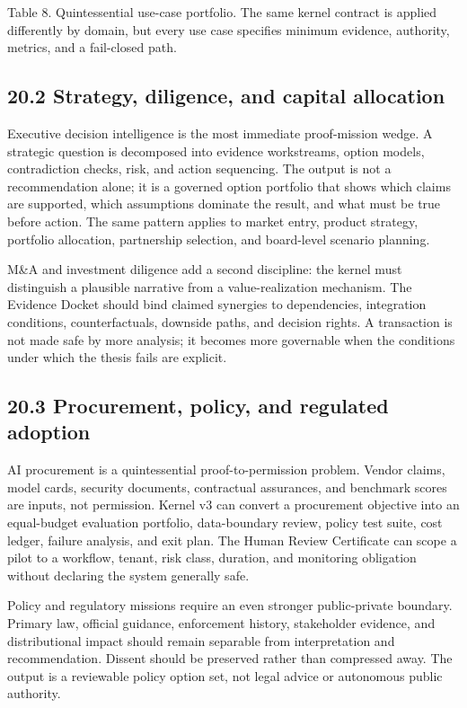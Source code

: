 Table 8. Quintessential use-case portfolio. The same kernel contract is
applied differently by domain, but every use case specifies minimum
evidence, authority, metrics, and a fail-closed path.

\subsection{20.2 Strategy, diligence, and capital
allocation}\label{strategy-diligence-and-capital-allocation}

Executive decision intelligence is the most immediate proof-mission
wedge. A strategic question is decomposed into evidence workstreams,
option models, contradiction checks, risk, and action sequencing. The
output is not a recommendation alone; it is a governed option portfolio
that shows which claims are supported, which assumptions dominate the
result, and what must be true before action. The same pattern applies to
market entry, product strategy, portfolio allocation, partnership
selection, and board-level scenario planning.

M\&A and investment diligence add a second discipline: the kernel must
distinguish a plausible narrative from a value-realization mechanism.
The Evidence Docket should bind claimed synergies to dependencies,
integration conditions, counterfactuals, downside paths, and decision
rights. A transaction is not made safe by more analysis; it becomes more
governable when the conditions under which the thesis fails are
explicit.

\subsection{20.3 Procurement, policy, and regulated
adoption}\label{procurement-policy-and-regulated-adoption}

AI procurement is a quintessential proof-to-permission problem. Vendor
claims, model cards, security documents, contractual assurances, and
benchmark scores are inputs, not permission. Kernel v3 can convert a
procurement objective into an equal-budget evaluation portfolio,
data-boundary review, policy test suite, cost ledger, failure analysis,
and exit plan. The Human Review Certificate can scope a pilot to a
workflow, tenant, risk class, duration, and monitoring obligation
without declaring the system generally safe.

Policy and regulatory missions require an even stronger public-private
boundary. Primary law, official guidance, enforcement history,
stakeholder evidence, and distributional impact should remain separable
from interpretation and recommendation. Dissent should be preserved
rather than compressed away. The output is a reviewable policy option
set, not legal advice or autonomous public authority.

